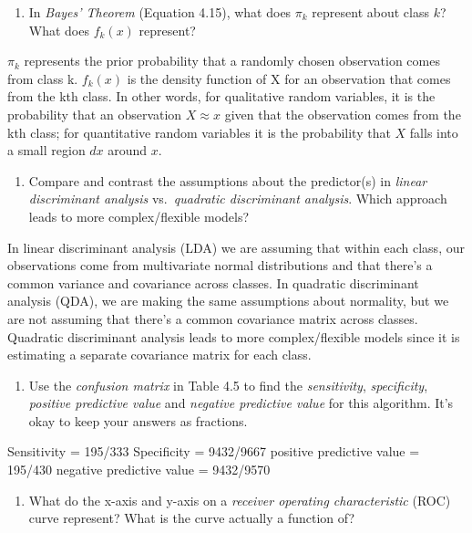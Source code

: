 \documentclass[
]{article}
\providecommand{\tightlist}{%
  \setlength{\itemsep}{0pt}\setlength{\parskip}{0pt}}
\begin{document}
\begin{enumerate}
\def\labelenumi{\arabic{enumi}.}
\setcounter{enumi}{3}
\tightlist
\item
  In \emph{Bayes' Theorem} (Equation 4.15), what does \(\pi_k\)
  represent about class \(k\)? What does \(f_k(x)\) represent?
\end{enumerate}

\(\pi_k\) represents the prior probability that a randomly chosen
observation comes from class k. \(f_k(x)\) is the density function of X
for an observation that comes from the kth class. In other words, for
qualitative random variables, it is the probability that an observation
\(X \approx x\) given that the observation comes from the kth class; for
quantitative random variables it is the probability that \(X\) falls
into a small region \(dx\) around \(x\).

\begin{enumerate}
\def\labelenumi{\arabic{enumi}.}
\setcounter{enumi}{4}
\tightlist
\item
  Compare and contrast the assumptions about the predictor(s) in
  \emph{linear discriminant analysis} vs.~\emph{quadratic discriminant
  analysis}. Which approach leads to more complex/flexible models?
\end{enumerate}

In linear discriminant analysis (LDA) we are assuming that within each
class, our observations come from multivariate normal distributions and
that there's a common variance and covariance across classes. In
quadratic discriminant analysis (QDA), we are making the same
assumptions about normality, but we are not assuming that there's a
common covariance matrix across classes. Quadratic discriminant analysis
leads to more complex/flexible models since it is estimating a separate
covariance matrix for each class.

\begin{enumerate}
\def\labelenumi{\arabic{enumi}.}
\setcounter{enumi}{5}
\tightlist
\item
  Use the \emph{confusion matrix} in Table 4.5 to find the
  \emph{sensitivity}, \emph{specificity}, \emph{positive predictive
  value} and \emph{negative predictive value} for this algorithm. It's
  okay to keep your answers as fractions.
\end{enumerate}

Sensitivity = 195/333 Specificity = 9432/9667 positive predictive value
= 195/430 negative predictive value = 9432/9570

\begin{enumerate}
\def\labelenumi{\arabic{enumi}.}
\setcounter{enumi}{6}
\tightlist
\item
  What do the x-axis and y-axis on a \emph{receiver operating
  characteristic} (ROC) curve represent? What is the curve actually a
  function of?
\end{enumerate}
\end{document}
